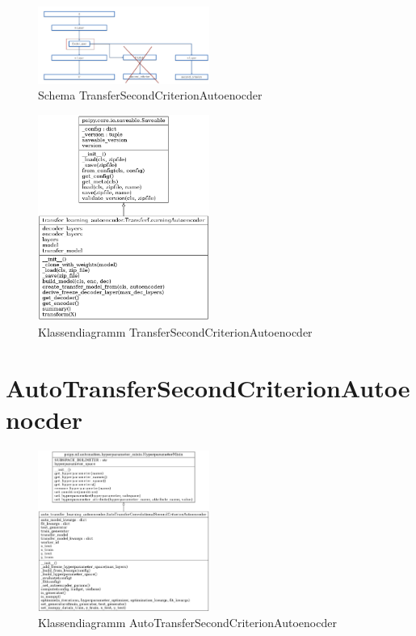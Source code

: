 	\begin{figure}[h]
		\centering
		\includegraphics[width=0.5\textwidth, center]{bilder/Schema_Autoencoders/Schema_TSCAE.png}
		\caption[Schema TransferSecondCriterionAutoenocder]{Schema TransferSecondCriterionAutoenocder}
		\label{img:SchemaTSCAE}
	\end{figure}  

	
	\begin{figure}[h]
		\centering
		\includegraphics[width=0.5\textwidth, center]{bilder/Klassendiagramme/Klassendiagramm_TLCSCAE.png}
		\caption[Klassendiagramm TransferSecondCriterionAutoenocder]{Klassendiagramm TransferSecondCriterionAutoenocder}
		\label{img:KlassendiagrammTransferSecondCriterionAutoenocder}
	\end{figure}  
			
	\section{AutoTransferSecondCriterionAutoenocder}
	\label{sec:AutoTransferSecondCriterionAutoenocder}


	\begin{figure}[h]
		\centering
		\includegraphics[width=0.5\textwidth, center]{bilder/Klassendiagramme/Klassendiagramm_AutoTLCSCAE.png}
		\caption[Klassendiagramm AutoTransferSecondCriterionAutoenocder]{Klassendiagramm AutoTransferSecondCriterionAutoenocder}
		\label{img:KlassendiagrammAutoTransferSecondCriterionAutoenocder}
	\end{figure}  
